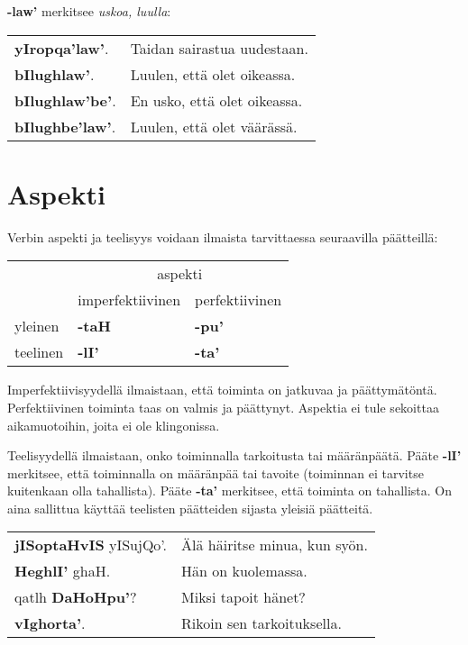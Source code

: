 \documentclass{book}
\begin{document}
\textbf{-law'} merkitsee \textit{uskoa, luulla}:

\begin{tabular}{l l}
    \textbf{yIropqa'law'}. & Taidan sairastua uudestaan. \\
    \textbf{bIlughlaw'}. & Luulen, että olet oikeassa. \\
    \textbf{bIlughlaw'be'}. & En usko, että olet oikeassa. \\
    \textbf{bIlughbe'law'}. & Luulen, että olet väärässä. \\
\end{tabular}

\section{Aspekti}

Verbin aspekti ja teelisyys voidaan ilmaista tarvittaessa seuraavilla päätteillä:

\begin{tabular}{l l l}
    & \multicolumn{2}{c}{aspekti} \\
    & imperfektiivinen & perfektiivinen \\
    yleinen & \textbf{-taH} & \textbf{-pu'} \\
    teelinen & \textbf{-lI'} & \textbf{-ta'} \\
\end{tabular}

Imperfektiivisyydellä ilmaistaan, että toiminta on jatkuvaa ja päättymätöntä. 
Perfektiivinen toiminta taas on valmis ja päättynyt.
Aspektia ei tule sekoittaa aikamuotoihin, joita ei ole klingonissa.

Teelisyydellä ilmaistaan, onko toiminnalla tarkoitusta tai määränpäätä.
Pääte \textbf{-lI'} merkitsee, että toiminnalla on määränpää tai tavoite (toiminnan ei tarvitse kuitenkaan olla tahallista).
Pääte \textbf{-ta'} merkitsee, että toiminta on tahallista.
On aina sallittua käyttää teelisten päätteiden sijasta yleisiä päätteitä.

\begin{tabular}{l l}
    \textbf{jISoptaHvIS} yISujQo'. & Älä häiritse minua, kun syön. \\
    \textbf{HeghlI'} ghaH. & Hän on kuolemassa. \\
    qatlh \textbf{DaHoHpu'}? & Miksi tapoit hänet? \\
    \textbf{vIghorta'}. & Rikoin sen tarkoituksella. \\
\end{tabular}
\end{document}
